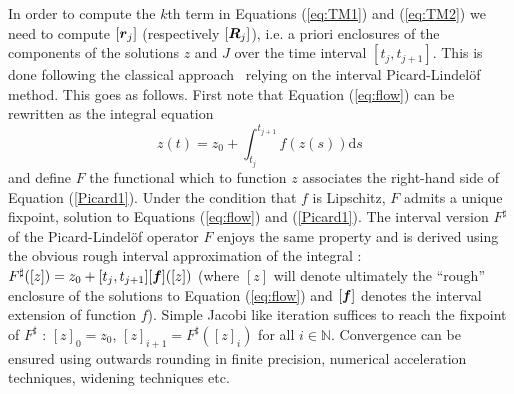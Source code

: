 \documentclass{sig-alternate-05-2015}
\newcommand\ForAuthors[1]%
 {\par\smallskip                     %
  \begin{center}%
   \fbox%
   {\parbox{0.9\linewidth}%
    {\raggedright\sc--- #1}%
   }%
  \end{center}%
  \par\smallskip                     %
 }
\def\N{{\mathbb N}}
\def\intvl#1{\mbox{$[ #1 ]$}}
\begin{document}
In order to compute the $k$th term in Equations (\ref{eq:TM1}) and (\ref{eq:TM2}) we need
to compute $\intvl{\r_j}$ (respectively $\intvl{\bfm{R}_j}$), i.e. a priori enclosures of
the components of the solutions $z$ and $J$ over the
time interval $[t_j,t_{j+1}]$. This is done following the classical approach~\cite{Nedialkov99} relying on the  interval
Picard-Lindel\"of method. This goes as follows. First note that Equation 
(\ref{eq:flow}) can be rewritten as the integral equation
\begin{equation}
z(t) = z_0+\int_{t_j}^{t_{j+1}} \! f(z(s)) \mathrm{d}s
\label{Picard1}
\end{equation}
and define $F$ the functional which to function $z$ associates the right-hand
side of Equation (\ref{Picard1}). Under the condition that $f$ is Lipschitz, $F$ 
admits a unique fixpoint, solution to Equations (\ref{eq:flow}) and
(\ref{Picard1}). The interval version ${F}^{\sharp}$ of the Picard-Lindel\"of operator $F$ 
enjoys the same property and is derived using the obvious rough interval approximation
of the integral : $F^{\sharp}(\intvl{z})=z_0+[t_j,t_{j+1}][\f](\intvl{z})$ (where
$\intvl{z}$ will denote ultimately the ``rough'' enclosure of the solutions to
Equation (\ref{eq:flow}) and $[\f]$ denotes  the interval extension of function $f$). 
Simple Jacobi like iteration suffices to reach the fixpoint of $F^{\sharp}$ : 
$\intvl{z}_0=z_0$, $\intvl{z}_{i+1}=F^{\sharp}(\intvl{z}_i)$ for all $i \in \N$. 
Convergence can be ensured using outwards rounding in finite precision,
numerical acceleration techniques, widening techniques etc. 

\end{document}
